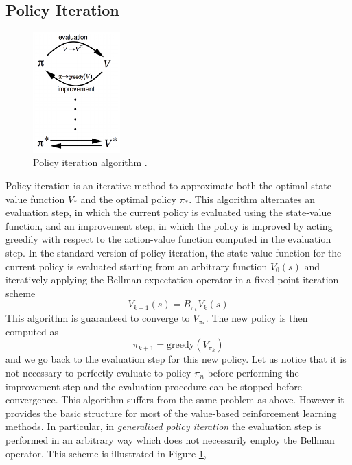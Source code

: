 \subsection{Policy Iteration}
\begin{figure}[t]
	\centering
	\includegraphics[width=0.3\textwidth]{Images/2_0_policy_iteration.png}
	\caption[Policy iteration algorithm]{Policy iteration algorithm \cite{sutton1998introduction}.}
	\label{fig:policy_iteration}
\end{figure}
Policy iteration is an iterative method to approximate both the optimal state-value function $V_*$ and the optimal policy $\pi_*$. This algorithm alternates an evaluation step, in which the current policy is evaluated using the state-value function, and an improvement step, in which the policy is improved by acting greedily with respect to the action-value function computed in the evaluation step. In the standard version of policy iteration, the state-value function for the current policy is evaluated starting from an arbitrary function $V_0(s)$ and iteratively applying the Bellman expectation operator in a fixed-point iteration scheme 
\begin{equation*}
	V_{k+1}(s) = B_{\pi_k} V_k(s)
\end{equation*}
This algorithm is guaranteed to converge to $V_{\pi_*}$. The new policy is then computed as 
\begin{equation*}
	\pi_{k+1} = \text{greedy}(V_{\pi_k})
\end{equation*}
and we go back to the evaluation step for this new policy. Let us notice that it is not necessary to perfectly evaluate to policy $\pi_n$ before performing the improvement step and the evaluation procedure can be stopped before convergence. This algorithm suffers from the same problem as above. However it provides the basic structure for most of the value-based reinforcement learning methods. In particular, in \emph{generalized policy iteration} the evaluation step is performed in an arbitrary way which does not necessarily employ the Bellman operator. This scheme is illustrated in Figure \ref{fig:policy_iteration},

  


